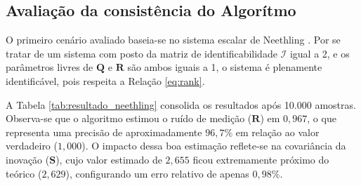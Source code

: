 \documentclass[journal]{IEEEtran}
\begin{document}
\subsection{Avaliação da consistência do Algorítmo }
O primeiro cenário avaliado baseia-se no sistema escalar de Neethling \cite{Neethling1974}. Por se tratar de um sistema com posto da matriz de identificabilidade $\mathcal{I}$ igual a 2, e os parâmetros livres de $\mathbf{Q}$ e $\mathbf{R}$ são ambos iguais a 1, o sistema é plenamente identificável, pois respeita a Relação \eqref{eq:rank}. 

A Tabela \ref{tab:resultado_neethling} consolida os resultados após 10.000 amostras. Observa-se que o algoritmo estimou o ruído de medição ($\mathbf{R}$) em $0,967$, o que representa uma precisão de aproximadamente $96,7\%$ em relação ao valor verdadeiro ($1,000$). O impacto dessa boa estimação reflete-se na covariância da inovação ($\mathbf{S}$), cujo valor estimado de $2,655$ ficou extremamente próximo do teórico ($2,629$), configurando um erro relativo de apenas $0,98\%$.
\end{document}
